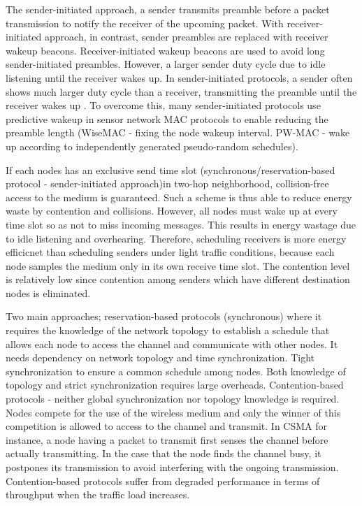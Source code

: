The sender-initiated approach, a sender transmits preamble before a packet transmission to notify the receiver of the upcoming packet. With receiver-initiated approach, in contrast, sender preambles are replaced with receiver wakeup beacons. Receiver-initiated wakeup beacons are used to avoid long sender-initiated preambles. However, a larger sender duty cycle due to idle listening until the receiver wakes up. In sender-initiated protocols, a sender often shows much larger duty cycle than a receiver, transmitting the preamble until the receiver wakes up \cite{pwmac}. To overcome this, many sender-initiated protocols use predictive wakeup in sensor network MAC protocols to enable reducing the preamble length (WiseMAC - fixing the node wakeup interval. PW-MAC - wake up according to independently generated pseudo-random schedules).

If each nodes has an exclusive send time slot (synchronous/reservation-based protocol - sender-initiated approach)in two-hop neighborhood, collision-free access to the medium is guaranteed. Such a scheme is thus able to reduce energy waste by contention and collisions. However, all nodes must wake up at every time slot so as not to miss incoming messages. This results in energy wastage due to idle listening and overhearing. Therefore, scheduling receivers is more energy efficicnet than scheduling senders under light traffic conditions, because each node samples the medium only in its own receive time slot. The contention level is relatively low since contention among senders which have different destination nodes is eliminated. \cite{y-mac}

Two main approaches; reservation-based protocols (synchronous) where it requires the knowledge of the network topology to establish a schedule that allows each node to access the channel and communicate with other nodes. It needs dependency on network topology and time synchronization. Tight synchronization to ensure a common schedule among nodes. Both knowledge of topology and strict synchronization requires large overheads. Contention-based protocols - neither global synchronization nor topology knowledge is required. Nodes compete for the use of the wireless medium and only the winner of this competition is allowed to access to the channel and transmit. In CSMA for instance, a node having a packet to transmit first senses the channel before actually transmitting. In the case that the node finds the channel busy, it postpones its transmission to avoid interfering with the ongoing transmission. Contention-based protocols suffer from degraded performance in terms of throughput when the traffic load increases. \cite{macsurvey}

